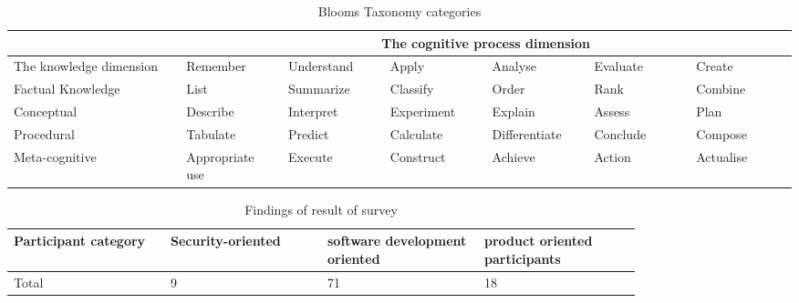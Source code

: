 \begin{table}[h]
    \centering
     \begin{tabular}{|p{0.22\linewidth}|p{0.13\linewidth}|p{0.13\linewidth}|p{0.13\linewidth}|p{0.13\linewidth}|p{0.13\linewidth}|p{0.13\linewidth}|}
    \hline
      & \multicolumn{6}{c|}{The cognitive process dimension}  \\ \hline
	The knowledge dimension & Remember & Understand  & Apply & Analyse & Evaluate & Create \\ \hline
	Factual Knowledge & List & Summarize & Classify & Order & Rank & Combine \\ \hline
	Conceptual & Describe & Interpret & Experiment & Explain & Assess & Plan \\ \hline
	Procedural & Tabulate & Predict & Calculate & Differentiate & Conclude & Compose \\ \hline
	Meta-cognitive & Appropriate use & Execute & Construct & Achieve & Action & Actualise \\ \hline
    \end{tabular}
    \caption{Blooms Taxonomy categories}
    \label{tab:bloomsubcategories}
\end{table}

\begin{table}[h]
    \centering
    \caption{Findings of result of survey}
    \label{tab:Surveydata}
    \begin{tabular}{|p{0.2\linewidth}|p{0.2\linewidth}|p{0.2\linewidth}|p{0.2\linewidth}|} \hline
    Participant category & Security-oriented & software development oriented & product oriented participants \\ \hline
    Total & 9 & 71 & 18\\ \hline
        \end{tabular}
\end{table}

